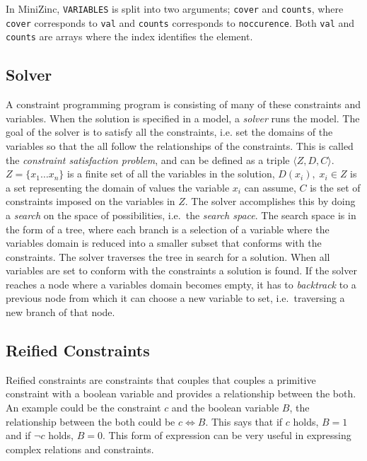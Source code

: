 In MiniZinc, \texttt{VARIABLES} is split into two arguments; \texttt{cover} and \texttt{counts}, where \texttt{cover} corresponds to \texttt{val} and \texttt{counts} corresponds to \texttt{noccurence}. Both \texttt{val} and \texttt{counts} are arrays where the index identifies the element.

\subsection{Solver}
A constraint programming program is consisting of many of these constraints and variables. When the solution is specified in a model, a \emph{solver} runs the model. The goal of the solver is to satisfy all the constraints, i.e. set the domains of the variables so that the all follow the relationships of the constraints. This is called the \emph{constraint satisfaction problem}, and can  be defined as a triple $\langle Z,D,C \rangle$. $Z=\{x_1 \ldots x_n\}$ is a finite set of all the variables in the solution, $D(x_i), \; x_i \in Z$ is a set representing the domain of values the variable $x_i$ can assume, $C$ is the set of constraints imposed on the variables in $Z$. The solver accomplishes this by doing a \emph{search} on the space of possibilities, i.e.\ the \emph{search space}. The search space is in the form of a tree, where each branch is a selection of a variable where the variables domain is reduced into a smaller subset that conforms with the constraints. The solver traverses the tree in search for a solution. When all variables are set to conform with the constraints a solution is found. If the solver reaches a node where a variables domain becomes empty, it has to \emph{backtrack} to a previous node from which it can choose a new variable to set, i.e.\ traversing a new branch of that node.

\cite{tsang_1993}
\cite{marriott_1998}
\cite{mz_manual}

\subsection{Reified Constraints}
Reified constraints are constraints that couples that couples a primitive constraint with a boolean variable and provides a relationship between the both. An example could be the constraint $c$ and the boolean variable $B$, the relationship between the both could be $c \Leftrightarrow B$. This says that if $c$ holds, $B = 1$ and if $\neg c$ holds, $B = 0$. This form of expression can be very useful in expressing complex relations and constraints.\cite{marriott_1998}

